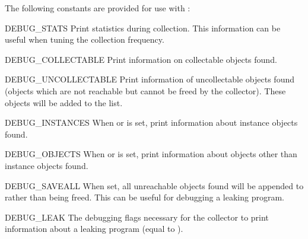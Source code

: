 The following constants are provided for use with
:

\begin{datadesc}{DEBUG_STATS}
Print statistics during collection.  This information can
be useful when tuning the collection frequency.
\end{datadesc}

\begin{datadesc}{DEBUG_COLLECTABLE}
Print information on collectable objects found.
\end{datadesc}

\begin{datadesc}{DEBUG_UNCOLLECTABLE}
Print information of uncollectable objects found (objects which are
not reachable but cannot be freed by the collector).  These objects
will be added to the  list.
\end{datadesc}

\begin{datadesc}{DEBUG_INSTANCES}
When  or  is
set, print information about instance objects found.
\end{datadesc}

\begin{datadesc}{DEBUG_OBJECTS}
When  or  is
set, print information about objects other than instance objects found.
\end{datadesc}

\begin{datadesc}{DEBUG_SAVEALL}
When set, all unreachable objects found will be appended to
 rather than being freed.  This can be useful for debugging
a leaking program.
\end{datadesc}

\begin{datadesc}{DEBUG_LEAK}
The debugging flags necessary for the collector to print
information about a leaking program (equal to ).  
\end{datadesc}
